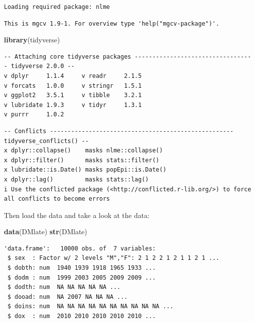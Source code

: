 \documentclass[
]{book}
\newenvironment{Shaded}{\begin{snugshade}}{\end{snugshade}}
\newcommand{\FunctionTok}[1]{\textcolor[rgb]{0.13,0.29,0.53}{\textbf{#1}}}
\newcommand{\NormalTok}[1]{#1}
\begin{document}
\begin{verbatim}
Loading required package: nlme
\end{verbatim}

\begin{verbatim}
This is mgcv 1.9-1. For overview type 'help("mgcv-package")'.
\end{verbatim}

\begin{Shaded}
\begin{Highlighting}[]
\FunctionTok{library}\NormalTok{(tidyverse)}
\end{Highlighting}
\end{Shaded}

\begin{verbatim}
-- Attaching core tidyverse packages ---------------------------------- tidyverse 2.0.0 --
v dplyr     1.1.4     v readr     2.1.5
v forcats   1.0.0     v stringr   1.5.1
v ggplot2   3.5.1     v tibble    3.2.1
v lubridate 1.9.3     v tidyr     1.3.1
v purrr     1.0.2     
\end{verbatim}

\begin{verbatim}
-- Conflicts ---------------------------------------------------- tidyverse_conflicts() --
x dplyr::collapse()    masks nlme::collapse()
x dplyr::filter()      masks stats::filter()
x lubridate::is.Date() masks popEpi::is.Date()
x dplyr::lag()         masks stats::lag()
i Use the conflicted package (<http://conflicted.r-lib.org/>) to force all conflicts to become errors
\end{verbatim}

Then load the data and take a look at the data:

\begin{Shaded}
\begin{Highlighting}[]
\FunctionTok{data}\NormalTok{(DMlate)}
\FunctionTok{str}\NormalTok{(DMlate)}
\end{Highlighting}
\end{Shaded}

\begin{verbatim}
'data.frame':   10000 obs. of  7 variables:
 $ sex  : Factor w/ 2 levels "M","F": 2 1 2 2 1 2 1 1 2 1 ...
 $ dobth: num  1940 1939 1918 1965 1933 ...
 $ dodm : num  1999 2003 2005 2009 2009 ...
 $ dodth: num  NA NA NA NA NA ...
 $ dooad: num  NA 2007 NA NA NA ...
 $ doins: num  NA NA NA NA NA NA NA NA NA NA ...
 $ dox  : num  2010 2010 2010 2010 2010 ...
\end{verbatim}
\end{document}
